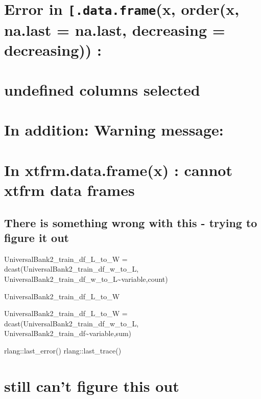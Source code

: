 \documentclass[
]{article}
\begin{document}
\hypertarget{error-in-.data.framex-orderx-na.last-na.last-decreasing-decreasing}{%
\section{\texorpdfstring{Error in \texttt{{[}.data.frame}(x, order(x,
na.last = na.last, decreasing = decreasing))
:}{Error in {[}.data.frame(x, order(x, na.last = na.last, decreasing = decreasing)) :}}\label{error-in-.data.framex-orderx-na.last-na.last-decreasing-decreasing}}

\hypertarget{undefined-columns-selected}{%
\section{undefined columns selected}\label{undefined-columns-selected}}

\hypertarget{in-addition-warning-message-1}{%
\section{In addition: Warning
message:}\label{in-addition-warning-message-1}}

\hypertarget{in-xtfrm.data.framex-cannot-xtfrm-data-frames-1}{%
\section{In xtfrm.data.frame(x) : cannot xtfrm data
frames}\label{in-xtfrm.data.framex-cannot-xtfrm-data-frames-1}}

\hypertarget{there-is-something-wrong-with-this---trying-to-figure-it-out}{%
\subsection{There is something wrong with this - trying to figure it
out}\label{there-is-something-wrong-with-this---trying-to-figure-it-out}}

UniversalBank2\_train\_df\_L\_to\_W =
dcast(UniversalBank2\_train\_df\_w\_to\_L,
UniversalBank2\_train\_df\_w\_to\_L\textasciitilde variable,count)

UniversalBank2\_train\_df\_L\_to\_W

UniversalBank2\_train\_df\_L\_to\_W =
dcast(UniversalBank2\_train\_df\_w\_to\_L,
UniversalBank2\_train\_df\textasciitilde variable,sum)

rlang::last\_error() rlang::last\_trace()

\hypertarget{still-cant-figure-this-out}{%
\section{still can't figure this out}\label{still-cant-figure-this-out}}
\end{document}
